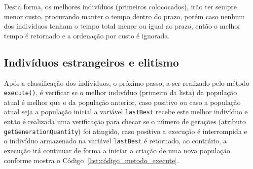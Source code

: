 \par Desta forma, os melhores indivíduos (primeiros colococados), irão ter sempre menor custo, procurando manter o tempo dentro do prazo, porém caso nenhum dos indivíduos tenham o tempo total menor ou igual ao prazo, então o melhor tempo é retornado e a ordenação por custo é ignorada.

\subsection{Indivíduos estrangeiros e elitismo} \label{ind_estrangeiros_subsection}

\par Após a classificação dos indivíduos, o próximo passo, a ser realizado pelo método \texttt{execute()}, é verificar
se o melhor indivíduo (primeiro da lista) da população atual é melhor que o da população anterior, caso positivo ou
caso a população atual seja a população inicial a variável \texttt{lastBest} recebe este melhor indivíduo e então é 
realizada uma verificação para checar se o número de gerações (atributo \texttt{getGenerationQuantity}) foi atingido, 
caso positivo a execução é interrompida e o indivíduo armazenado na variável \texttt{lastBest} é retornado, ao contrário, 
a execução irá continuar de forma a iniciar a criação de uma nova população conforme mostra o Código~\ref{list:código_metodo_execute}.


